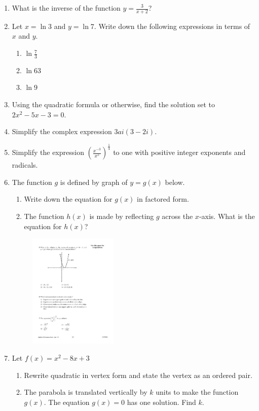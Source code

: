 \documentclass[12pt, oneside]{article}
\begin{document}
\begin{enumerate}
\item What is the inverse of the function $y=\frac{3}{x+2}$?

\item Let $x=\ln 3$ and $y=\ln 7$. Write down the following expressions in terms of $x$ and $y$.
\begin{enumerate}
    \item $\ln \frac{7}{3}$
    \item $\ln 63$
    \item $\ln 9$
\end{enumerate}

\item Using the quadratic formula or otherwise, find the solution set to $2x^2-5x-3=0$.

\item Simplify the complex expression $3ai(3-2i)$.

\item Simplify the expression $\displaystyle \left( \frac{x^{-3}}{x^5} \right)^{\frac{1}{4}}$ to one with positive integer exponents and radicals.

\newpage
\item The function $g$ is defined by graph of $y=g(x)$ below.
\begin{enumerate}
    \item Write down the equation for $g(x)$ in factored form.
    \item The function $h(x)$ is made by reflecting $g$ across the $x$-axis. What is the equation for $h(x)$?
\end{enumerate}

\begin{figure}[!ht]
    \centering
    \includegraphics[width=0.4\textwidth]{parabola-graphic.pdf}
\end{figure}

\item Let $f(x) = x^2-8x+3$
\begin{enumerate}
    \item Rewrite quadratic in vertex form and state the vertex as an ordered pair.
    \item The parabola is translated vertically by $k$ units to make the function $g(x)$. The equation $g(x)=0$ has one solution. Find $k$.
\end{enumerate}


\end{enumerate}
\end{document}
